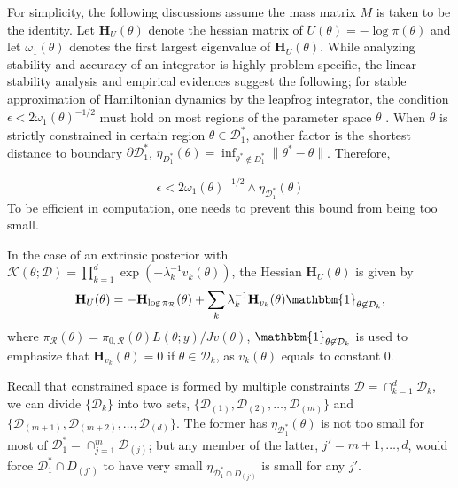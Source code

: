 \documentclass[10pt]{article}
\newcommand{\mc}[1]{\mathcal{#1}}
\DeclareMathOperator{\1}{\mathbbm{1}}
\newcommand{\dt}{\epsilon} %
\newcommand{\mass}{M} %
\newcommand{\hess}{\mathbf{H}} %
\begin{document}
For simplicity, the following discussions assume the mass matrix $\mass$ is taken to be the identity. Let $\hess_U(\theta)$ denote the hessian matrix of $U(\theta) = - \log \pi(\theta)$ and let $\omega_1(\theta)$ denotes the first largest eigenvalue of $\hess_U(\theta)$. While analyzing stability and accuracy of an integrator is highly problem specific, the linear stability analysis and empirical evidences suggest the following; for stable approximation of Hamiltonian dynamics by the leapfrog integrator, the condition $\dt < 2\omega_1(\theta)^{-1/2}$ 
must hold on most regions of the parameter space $\theta$ \citep{hairer06}. %
When $\theta$ is strictly constrained in certain region $\theta\in \mc D^*_1$, another factor is the shortest distance to boundary $\partial\mc D^*_1$, $\eta_{D^*_1}(\theta)= \inf_{\theta^*\not\in D_1^*}\|\theta^*-\theta\|$. Therefore,

\begin{equation}
\label{stabilityCondition}
\dt <  2\omega_1(\theta)^{-1/2} \wedge \eta_{\mc D^*_1}(\theta) 
\end{equation}
To be efficient in computation, one needs to prevent this bound from being too small.

In the case of an extrinsic posterior with $\mc K(\theta;\mc D)= \prod_{k=1}^{d} \exp(- \lambda_k^{-1}v_k(\theta))$, the Hessian $\hess_U(\theta)$ is given by
\begin{equation}
\label{eq:hessian_extrinsic}
\hess_U(\theta) = -\hess_{\log \pi_\mc R}(\theta)+\sum_k \lambda_k^{-1} \hess_{v_k}(\theta) \mathbbm{1}_{\theta\not\in \mc D_k},
\end{equation}
where $\pi_\mc R(\theta)=\pi_{0,\mc R}(\theta)L(\theta;y)/Jv(\theta)$, $\mathbbm{1}_{\theta\not\in \mc D_k}$ is used to emphasize that $\hess_{v_k}(\theta)=0$ if $\theta\in \mc D_k$, as $v_k(\theta)$ equals to constant $0$.


Recall that constrained space is formed by multiple constraints $\mc D=\cap_{k=1}^d \mc D_k$, we can divide $\{\mc D_k\}$ into two sets, $\{\mc D_{(1)}, \mc D_{(2)}, \ldots , \mc D_{(m)} \}$ and $\{\mc D_{(m+1)}, \mc D_{(m+2)}, \ldots , \mc D_{(d)} \}$. The former has
 $\eta_{\mc D^*_1}(\theta)$ is not too small for most of $\mc D^*_1= \cap_{j=1}^m \mc D_{(j)}$; but any member of the latter, $j'= m+1, \ldots, d$, would force $\mc D^*_1 \cap D_{(j')}$ to have very small $\eta_{\mc D^*_1 \cap D_{(j')}}$ is small for any $j'$.
\end{document}
